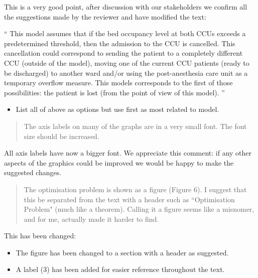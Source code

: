 \documentclass{article}
\begin{document}
This is a very good point, after discussion with our stakeholders we confirm all
the suggestions made by the reviewer and have modified the text:

``
This model assumes that if the bed occupancy level at both CCUs exceeds a
predetermined threshold, then the admission to the CCU is cancelled. This
cancellation could correspond to sending the patient to a completely different
CCU (outside of the model), moving one of the current CCU patients (ready to be
discharged) to another ward and/or using the post-anesthesia care unit
as a temporary overflow measure. This models corresponds to the first of those
possibilities: the patient is lost (from the point of view of this model).
''

\begin{itemize}
    \item List all of above as options but use first as most related to model.
\end{itemize}

\begin{quote}
    \begin{textit}
        {
        The axis labels on many of the graphs are in a very small font. The
        font size should be increased.
        }
    \end{textit}
\end{quote}

All axis labels have now a bigger font. We appreciate this comment: if any
other aspects of the graphics could be improved we would be happy to make the
suggested changes.

\begin{quote}
    \begin{textit}
        {
        The optimisation problem is shown as a figure (Figure 6). I suggest
        that this be separated from the text with a header such as
        ``Optimisation Problem" (much like a theorem).  Calling it a figure
        seems like a misnomer, and for me, actually made it harder to find.
        }
    \end{textit}
\end{quote}

This has been changed:

\begin{itemize}
    \item The figure has been changed to a section with a header as suggested.
    \item A label (3) has been added for easier reference throughout the text.
\end{itemize}
\end{document}
